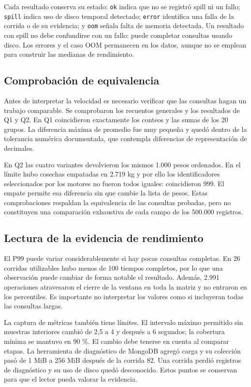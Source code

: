\documentclass[12pt,letterpaper]{article}
\begin{document}
Cada resultado conserva su estado: \texttt{ok} indica que no se registró spill ni un fallo; \texttt{spill} indica uso de disco temporal detectado; \texttt{error} identifica una falla de la corrida o de su evidencia; y \texttt{oom} señala falta de memoria detectada. Un resultado con spill no debe confundirse con un fallo: puede completar consultas usando disco. Los errores y el caso OOM permanecen en los datos, aunque no se emplean para construir las medianas de rendimiento.

\subsection*{Comprobación de equivalencia}
Antes de interpretar la velocidad es necesario verificar que las consultas hagan un trabajo comparable. Se comprobaron los recuentos generales y los resultados de Q1 y Q2. En Q1 coincidieron exactamente los conteos y las sumas de los 20 grupos. La diferencia máxima de promedio fue muy pequeña y quedó dentro de la tolerancia numérica documentada, que contempla diferencias de representación de decimales.

En Q2 las cuatro variantes devolvieron los mismos 1.000 pesos ordenados. En el límite hubo cosechas empatadas en 2.719 kg y por ello los identificadores seleccionados por los motores no fueron todos iguales: coincidieron 999. El empate permite esa diferencia sin que cambie la lista de pesos. Estas comprobaciones respaldan la equivalencia de las consultas probadas, pero no constituyen una comparación exhaustiva de cada campo de los 500.000 registros.

\subsection*{Lectura de la evidencia de rendimiento}
El P99 puede variar considerablemente si hay pocas consultas completas. En 26 corridas utilizables hubo menos de 100 tiempos completos, por lo que una observación puede cambiar de forma notable el resultado. Además, 2.991 operaciones atravesaron el cierre de la ventana en toda la matriz y no entraron en los percentiles. Es importante no interpretar los valores como si incluyeran todas las consultas largas.

La captura de métricas también tiene límites. El intervalo máximo permitido sin muestras interiores cambió de 2,5 a 4 y después a 6 segundos; la cobertura mínima se mantuvo en 90 \%. El cambio debe tenerse en cuenta al comparar etapas. La herramienta de diagnóstico de MongoDB agregó carga y su colección pasó de 1 MiB a 256 MiB después de la corrida 82. Una corrida perdió registros de diagnóstico y su uso de disco quedó desconocido. Estos puntos se conservan para que el lector pueda valorar la evidencia.
\end{document}
